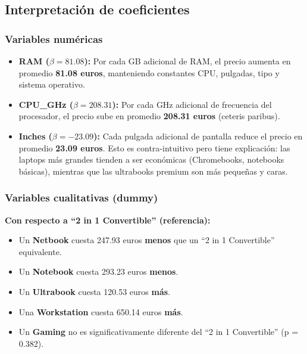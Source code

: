 \documentclass[12pt,a4paper]{article}
\begin{document}
\subsection{Interpretación de coeficientes}

\subsubsection{Variables numéricas}

\begin{itemize}
    \item \textbf{RAM ($\beta = 81.08$):} Por cada GB adicional de RAM, el precio aumenta en promedio \textbf{81.08 euros}, manteniendo constantes CPU, pulgadas, tipo y sistema operativo.
    
    \item \textbf{CPU\_GHz ($\beta = 208.31$):} Por cada GHz adicional de frecuencia del procesador, el precio sube en promedio \textbf{208.31 euros} (ceteris paribus).
    
    \item \textbf{Inches ($\beta = -23.09$):} Cada pulgada adicional de pantalla reduce el precio en promedio \textbf{23.09 euros}. Esto es contra-intuitivo pero tiene explicación: las laptops más grandes tienden a ser económicas (Chromebooks, notebooks básicas), mientras que las ultrabooks premium son más pequeñas y caras.
\end{itemize}

\subsubsection{Variables cualitativas (dummy)}

\textbf{Con respecto a ``2 in 1 Convertible'' (referencia):}
\begin{itemize}
    \item Un \textbf{Netbook} cuesta 247.93 euros \textbf{menos} que un ``2 in 1 Convertible'' equivalente.
    \item Un \textbf{Notebook} cuesta 293.23 euros \textbf{menos}.
    \item Un \textbf{Ultrabook} cuesta 120.53 euros \textbf{más}.
    \item Una \textbf{Workstation} cuesta 650.14 euros \textbf{más}.
    \item Un \textbf{Gaming} no es significativamente diferente del ``2 in 1 Convertible'' (p = 0.382).
\end{itemize}
\end{document}
